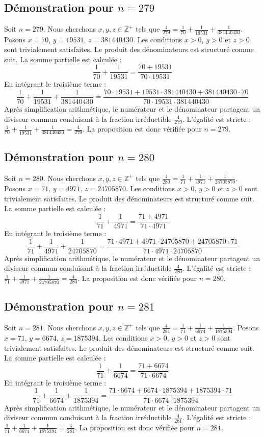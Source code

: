 \documentclass[11pt,a4paper]{article}
\begin{document}
\subsection{Démonstration pour $n = 279$}
Soit $n = 279$. Nous cherchons $x, y, z \in \mathbb{Z}^{+}$ tels que $\frac{4}{279} = \frac{1}{70} + \frac{1}{19531} + \frac{1}{381440430}$.
Posons $x = 70$, $y = 19531$, $z = 381440430$.
Les conditions $x > 0$, $y > 0$ et $z > 0$ sont trivialement satisfaites.
Le produit des dénominateurs est structuré comme suit. La somme partielle est calculée :
$$ \frac{1}{70} + \frac{1}{19531} = \frac{70+19531}{70 \cdot 19531} $$
En intégrant le troisième terme :
$$ \frac{1}{70} + \frac{1}{19531} + \frac{1}{381440430} = \frac{70 \cdot 19531 + 19531 \cdot 381440430 + 381440430 \cdot 70}{70 \cdot 19531 \cdot 381440430} $$
Après simplification arithmétique, le numérateur et le dénominateur partagent un diviseur commun conduisant à la fraction irréductible $\frac{4}{279}$.
L'égalité est stricte : $\frac{1}{70} + \frac{1}{19531} + \frac{1}{381440430} = \frac{4}{279}$.
La proposition est donc vérifiée pour $n = 279$.
\subsection{Démonstration pour $n = 280$}
Soit $n = 280$. Nous cherchons $x, y, z \in \mathbb{Z}^{+}$ tels que $\frac{4}{280} = \frac{1}{71} + \frac{1}{4971} + \frac{1}{24705870}$.
Posons $x = 71$, $y = 4971$, $z = 24705870$.
Les conditions $x > 0$, $y > 0$ et $z > 0$ sont trivialement satisfaites.
Le produit des dénominateurs est structuré comme suit. La somme partielle est calculée :
$$ \frac{1}{71} + \frac{1}{4971} = \frac{71+4971}{71 \cdot 4971} $$
En intégrant le troisième terme :
$$ \frac{1}{71} + \frac{1}{4971} + \frac{1}{24705870} = \frac{71 \cdot 4971 + 4971 \cdot 24705870 + 24705870 \cdot 71}{71 \cdot 4971 \cdot 24705870} $$
Après simplification arithmétique, le numérateur et le dénominateur partagent un diviseur commun conduisant à la fraction irréductible $\frac{4}{280}$.
L'égalité est stricte : $\frac{1}{71} + \frac{1}{4971} + \frac{1}{24705870} = \frac{4}{280}$.
La proposition est donc vérifiée pour $n = 280$.
\subsection{Démonstration pour $n = 281$}
Soit $n = 281$. Nous cherchons $x, y, z \in \mathbb{Z}^{+}$ tels que $\frac{4}{281} = \frac{1}{71} + \frac{1}{6674} + \frac{1}{1875394}$.
Posons $x = 71$, $y = 6674$, $z = 1875394$.
Les conditions $x > 0$, $y > 0$ et $z > 0$ sont trivialement satisfaites.
Le produit des dénominateurs est structuré comme suit. La somme partielle est calculée :
$$ \frac{1}{71} + \frac{1}{6674} = \frac{71+6674}{71 \cdot 6674} $$
En intégrant le troisième terme :
$$ \frac{1}{71} + \frac{1}{6674} + \frac{1}{1875394} = \frac{71 \cdot 6674 + 6674 \cdot 1875394 + 1875394 \cdot 71}{71 \cdot 6674 \cdot 1875394} $$
Après simplification arithmétique, le numérateur et le dénominateur partagent un diviseur commun conduisant à la fraction irréductible $\frac{4}{281}$.
L'égalité est stricte : $\frac{1}{71} + \frac{1}{6674} + \frac{1}{1875394} = \frac{4}{281}$.
La proposition est donc vérifiée pour $n = 281$.
\end{document}
